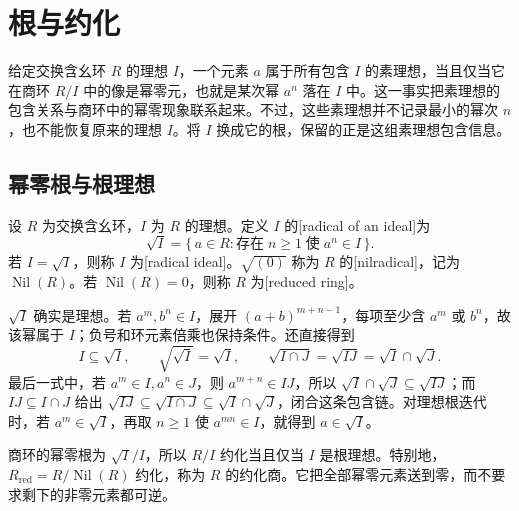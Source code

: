 
\section{根与约化}
\label{b3:sec:0102}

给定交换含幺环 \(R\) 的理想 \(I\)，一个元素 \(a\) 属于所有包含 \(I\) 的素理想，当且仅当它在商环 \(R/I\) 中的像是幂零元，也就是某次幂 \(a^n\) 落在 \(I\) 中。这一事实把素理想的包含关系与商环中的幂零现象联系起来。不过，这些素理想并不记录最小的幂次 \(n\)，也不能恢复原来的理想 \(I\)。将 \(I\) 换成它的根，保留的正是这组素理想包含信息。

\subsection{幂零根与根理想}
\label{b3:subsec:0102:01}

\begin{definition}\label{b3:def:radical-reduced}
	设 \(R\) 为交换含幺环，\(I\) 为 \(R\) 的理想。定义 \(I\) 的[radical of an ideal]为
	\[
		\sqrt I=\{\,a\in R:\text{存在}\;n\ge1\;\text{使}\;a^n\in I\,\}.
	\]
	若 \(I=\sqrt I\)，则称 \(I\) 为[radical ideal]。\(\sqrt{(0)}\) 称为 \(R\) 的[nilradical]，记为 \(\operatorname{Nil}(R)\)。若 \(\operatorname{Nil}(R)=0\)，则称 \(R\) 为[reduced ring]。
\end{definition}

\(\sqrt I\) 确实是理想。若 \(a^m,b^n\in I\)，展开 \((a+b)^{m+n-1}\)，每项至少含 \(a^m\) 或 \(b^n\)，故该幂属于 \(I\)；负号和环元素倍乘也保持条件。还直接得到
\[
	I\subseteq\sqrt I,\qquad \sqrt{\sqrt I}=\sqrt I, \qquad \sqrt{I\cap J}=\sqrt{IJ}=\sqrt I\cap\sqrt J.
\]
最后一式中，若 \(a^m\in I,a^n\in J\)，则 \(a^{m+n}\in IJ\)，所以 \(\sqrt I\cap\sqrt J\subseteq\sqrt{IJ}\)；而 \(IJ\subseteq I\cap J\) 给出 \(\sqrt{IJ}\subseteq\sqrt{I\cap J}\subseteq\sqrt I\cap\sqrt J\)，闭合这条包含链。对理想根迭代时，若 \(a^m\in\sqrt I\)，再取 \(n\ge1\) 使 \(a^{mn}\in I\)，就得到 \(a\in\sqrt I\)。

\ProseParagraphBreak
商环的幂零根为 \(\sqrt I/I\)，所以 \(R/I\) 约化当且仅当 \(I\) 是根理想。特别地，\(R_{\mathrm{red}}=R/\operatorname{Nil}(R)\) 约化，称为 \(R\) 的约化商。它把全部幂零元素送到零，而不要求剩下的非零元素都可逆。

